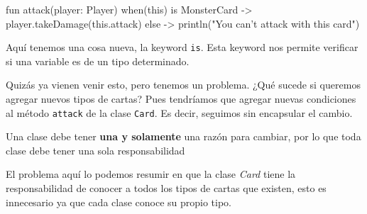   \begin{kotlin}
    fun attack(player: Player) {
      when(this) {
        is MonsterCard -> player.takeDamage(this.attack)
        else -> println("You can't attack with this card")
      }
    }
  \end{kotlin}

  Aquí tenemos una cosa nueva, la keyword \texttt{is}.
  Esta keyword nos permite verificar si una variable es de un tipo determinado.

  Quizás ya vienen venir esto, pero tenemos un problema.
  ¿Qué sucede si queremos agregar nuevos tipos de cartas?
  Pues tendríamos que agregar nuevas condiciones al método \texttt{attack} de la clase 
  \texttt{Card}.
  Es decir, seguimos sin encapsular el cambio.

  \begin{defaultbox}
    Una clase debe tener \textbf{una y solamente} una razón para cambiar, por lo que toda clase 
    debe tener una sola responsabilidad
  \end{defaultbox}

  El problema aquí lo podemos resumir en que la clase \textit{Card} tiene la responsabilidad de
  conocer a todos los tipos de cartas que existen, esto es innecesario ya que cada clase conoce
  su propio tipo.
